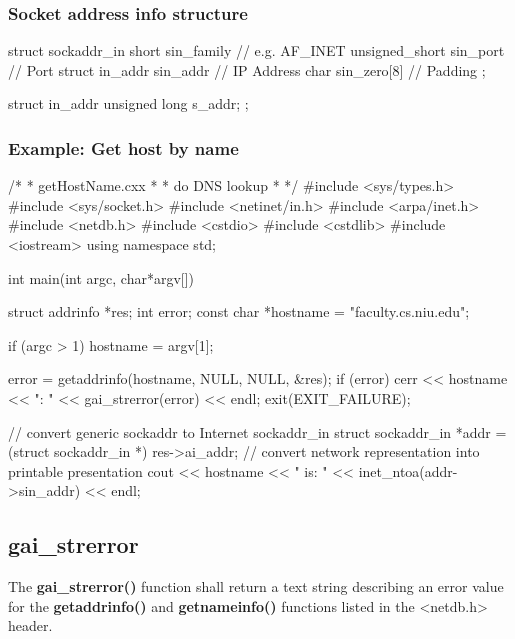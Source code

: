 \documentclass{report}
\begin{document}
    \subsubsection{Socket address info structure}
    \bigbreak \noindent 
    \begin{cppcode}
        struct sockaddr_in {
            short               sin_family  // e.g. AF_INET
            unsigned_short      sin_port    // Port
            struct in_addr      sin_addr    // IP Address
            char                sin_zero[8] // Padding
        };

        struct in_addr {
            unsigned long       s_addr;
        };
    \end{cppcode}
    \bigbreak \noindent 
    \pagebreak 
    \subsubsection{Example: Get host by name}
    \bigbreak \noindent 
    \begin{cppcode}
        /*
        * getHostName.cxx
        * 
        * 	do DNS lookup
        * 
        */
        #include <sys/types.h>
        #include <sys/socket.h>
        #include <netinet/in.h>
        #include <arpa/inet.h>
        #include <netdb.h>
        #include <cstdio>
        #include <cstdlib>
        #include <iostream>
        using namespace std;

        int main(int argc, char*argv[]) {
            struct addrinfo *res;
            int error;
            const char *hostname = "faculty.cs.niu.edu";

            if (argc > 1) {
                hostname = argv[1];
            } 

            error = getaddrinfo(hostname, NULL, NULL, &res);
            if (error) {
                cerr << hostname << ": " << gai_strerror(error) << endl;
                exit(EXIT_FAILURE);
            }	

            // convert generic sockaddr to Internet sockaddr_in
            struct sockaddr_in *addr = (struct sockaddr_in *) res->ai_addr;
            // convert network representation into printable presentation
            cout << hostname << " is: " << inet_ntoa(addr->sin_addr) << endl;
        }
    \end{cppcode}

    \pagebreak 
    \subsection{gai\_strerror}
    \bigbreak \noindent 
    \begin{concept}
        The \textbf{gai\_strerror()} function shall return a text string describing an error value for the \textbf{getaddrinfo()} and \textbf{getnameinfo()} functions listed in the <netdb.h> header.
    \end{concept}
    \bigbreak \noindent 
\end{document}
